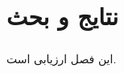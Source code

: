 
\chapter[نتایج و بحث]{\centering نتایج و بحث} \label{chapter:evaluation}

\paragraph*{}
این فصل ارزیابی است.
